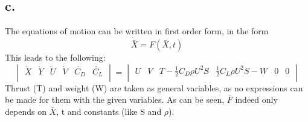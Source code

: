 \documentclass[a4paper,10pt,titlepage]{article}
\begin{document}
\subsection*{c.}
The equations of motion can be written in first order form, in the form
\begin{equation}
    \dot{\bar{X}} = F(\bar{X},t)
\end{equation}
This leads to the following:
\begin{equation*}
    \begin{vmatrix}
        \dot{X} & \dot{Y} & \dot{U} & \dot{V} & \dot{C_D} & \dot{C_L}  \\
    \end{vmatrix}
     =
    \begin{vmatrix}
        U & V & T - \frac{1}{2} C_D \rho U^2 S & \frac{1}{2} C_L \rho U^2 S - W & 0 & 0  \\
    \end{vmatrix}
\end{equation*}
Thrust (T) and weight (W) are taken as general variables, as no expressions can be made for them with the given variables. As can be seen, $\bar{F}$ indeed only depends on $\bar{X}$, t and constants (like S and $\rho$).
\end{document}
